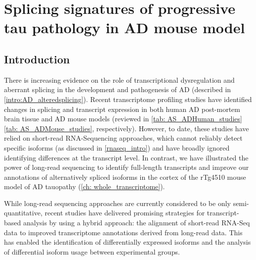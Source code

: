 \chapter{Splicing signatures of progressive tau pathology in AD mouse model}\label{ch: transcriptional_global_differences}

\section{Introduction}
There is increasing evidence on the role of transcriptional dysregulation and aberrant splicing in the development and pathogenesis of AD (described in \cref{intro:AD_alteredsplicing}). Recent transcriptome profiling studies have identified changes in splicing and transcript expression in both human AD post-mortem brain tissue and AD mouse models (reviewed in \cref{tab: AS_ADHuman_studies} \cref{tab: AS_ADMouse_studies}, respectively). However, to date, these studies have relied on short-read RNA-Sequencing approaches, which cannot reliably detect specific isoforms (as discussed in \cref{rnaseq_intro}) and have broadly ignored identifying differences at the transcript level. In contrast, we have illustrated the power of long-read sequencing to identify full-length transcripts and improve our annotations of alternatively spliced isoforms in the cortex of the rTg4510 mouse model of AD tauopathy (\cref{ch: whole_transcriptome}). 

While long-read sequencing approaches are currently considered to be only semi-quantitative, recent studies have delivered promising strategies for transcript-based analysis by using a hybrid approach\cite{Tseng2021}: the alignment of short-read RNA-Seq data to improved transcriptome annotations derived from long-read data. This has enabled the identification of differentially expressed isoforms and the analysis of differential isoform usage between experimental groups\cite{Tseng2021}. 

